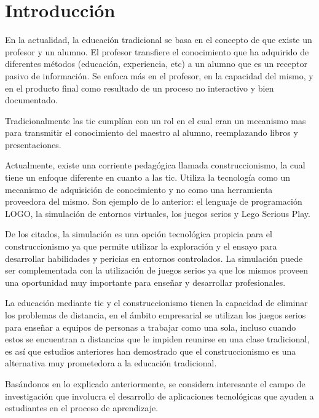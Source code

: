 \chapter{Introducción}

En la actualidad, la educación tradicional se basa en el concepto de que existe
un profesor y un alumno. El profesor transfiere el conocimiento que ha adquirido
de diferentes métodos (educación, experiencia, etc) a un alumno que es un
receptor pasivo de información\cite{laptop:instructionism}. Se enfoca más en el
profesor, en la capacidad del mismo, y en el producto final como resultado de un
proceso no interactivo y bien documentado\cite{igi:instructionism}.

Tradicionalmente las \Gls{tic} cumplían con un rol en el cual eran un mecanismo
mas para transmitir el conocimiento del maestro al alumno, reemplazando libros y
presentaciones.

Actualmente, existe una corriente pedagógica llamada construccionismo, la cual
tiene un enfoque diferente en cuanto a las \Gls{tic}. Utiliza la tecnología como un
mecanismo de adquisición de conocimiento y no como una herramienta proveedora
del mismo\cite{sasha:construtivism}. Son ejemplo de lo anterior: el lenguaje de
programación LOGO, la simulación de entornos virtuales, los juegos serios y Lego
Serious Play.

De los citados, la simulación es una opción tecnológica propicia para el
construccionismo ya que permite utilizar la exploración y el ensayo para
desarrollar habilidades y pericias en entornos
controlados\cite{humphreys2013developing}. La simulación puede ser complementada
con la utilización de juegos serios ya que los mismos proveen una oportunidad
muy importante para enseñar y desarrollar profesionales\cite{sg:aoverview}.

La educación mediante \Gls{tic} y el construccionismo tienen la capacidad de
eliminar los problemas de distancia, en el ámbito empresarial se utilizan los
juegos serios para enseñar a equipos de personas a trabajar como una sola,
incluso cuando estos se encuentran a distancias que le impiden reunirse en una
clase tradicional\cite{mariluz:seiousgames}, es así que estudios anteriores han
demostrado que el construccionismo es una alternativa muy prometedora a la
educación tradicional\cite{sasha:construtivism}.

Basándonos en lo explicado anteriormente, se considera interesante el campo de
investigación que involucra el desarrollo de aplicaciones tecnológicas que
ayuden a estudiantes en el proceso de aprendizaje. 

